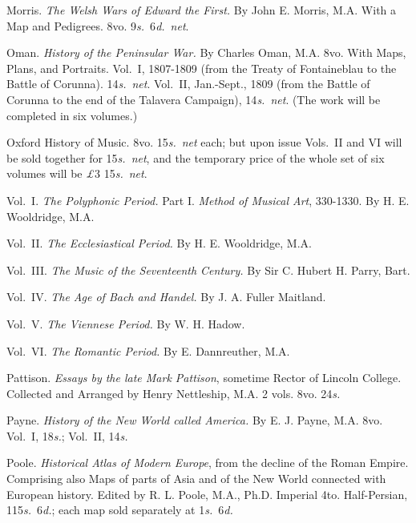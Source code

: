 \documentclass[12pt,oneside]{book}[2021/10/04]
\newenvironment{advlist}{
  \begin{description}[leftmargin=1em, parsep=0.2ex, listparindent=1em,]
}{\end{description}}
\newenvironment{vollist}{
\begin{description}[nosep, topsep=-1ex, itemindent=-1em, leftmargin=2em]
}{\end{description}}
\newcommand{\¬}{\hphantom{0}}
\begin{document}
\begin{advlist}
\item[Morris.] \textit{The Welsh Wars of
Edward the First.} By John E. Morris,
M.A. With a Map and Pedigrees.
8vo. 9\textit{s.}\ 6\textit{d.}\ \textit{net}.

\item[Oman.] \textit{History of the Peninsular
War.} By Charles Oman, M.A.
8vo. With Maps, Plans, and Portraits.
Vol.\ I, 1807-1809 (from the
Treaty of Fontaineblau to the Battle
of Corunna). 14\textit{s.}\ \textit{net}. Vol.\ II,
Jan.-Sept., 1809 (from the Battle of
Corunna to the end of the Talavera
Campaign), 14\textit{s.}\ \textit{net}. (The work
will be completed in six volumes.)

\item[Oxford History of Music.]
8vo. 15\textit{s.}\ \textit{net} each; but upon issue
Vols.\ II and VI will be sold together
for 15\textit{s.}\ \textit{net}, and the temporary
price of the whole set of
six volumes will be \textit{£}3 15\textit{s.}\ \textit{net}.
\begin{vollist}
\item Vol.\ I. \textit{The Polyphonic Period.} Part I.
\textit{Method of Musical Art}, 330-1330.
By H. E. Wooldridge, M.A.
\item Vol.\ II. \textit{The Ecclesiastical Period.} By
H. E. Wooldridge, M.A.
\item Vol.\ III. \textit{The Music of the Seventeenth
Century.} By Sir C. Hubert H.
Parry, Bart.
\item Vol.\ IV. \textit{The Age of Bach and Handel.}
By J. A. Fuller Maitland.
\item Vol.\ V. \textit{The Viennese Period.} By
W. H. Hadow.
\item Vol.\ VI. \textit{The Romantic Period.} By
E. Dannreuther, M.A.
\end{vollist}
\item[Pattison.] \textit{Essays by the late
Mark Pattison}, sometime Rector of
Lincoln College. Collected and
Arranged by Henry Nettleship,
M.A. 2 vols. 8vo. 24\textit{s.}

\item[Payne.] \textit{History of the New
World called America.} By E. J.
Payne, M.A. 8vo. Vol.\ I, 18\textit{s.};
Vol.\ II, 14\textit{s.}

\item[Poole.] \textit{Historical Atlas of
Modern Europe}, from the decline of
the Roman Empire. Comprising
also Maps of parts of Asia and of
the New World connected with
European history. Edited by
R. L. Poole, M.A., Ph.D. Imperial
4to. Half-Persian, 115\textit{s.}\ 6\textit{d.}; each
map sold separately at 1\textit{s.}\ 6\textit{d.}


\end{advlist}
\end{document}
